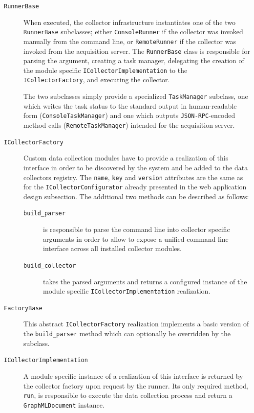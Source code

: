 \begin{description}
  \item[\texttt{RunnerBase}] When executed, the collector infrastructure instantiates one of the two \texttt{Runner\BreakableSlash{}Base} subclasses; either \texttt{ConsoleRunner} if the collector was invoked manually from the command line, or \texttt{RemoteRunner} if the collector was invoked from the acquisition server. The \texttt{RunnerBase} class is responsible for parsing the argument, creating a task manager, delegating the creation of the module specific \texttt{ICollectorImplementation} to the \texttt{ICollectorFactory}, and executing the collector.

    The two subclasses simply provide a specialized \texttt{TaskManager} subclass, one which writes the task status to the standard output in human-readable form (\texttt{ConsoleTask\BreakableSlash{}Manager}) and one which outputs \texttt{JSON-RPC}-encoded method calls (\texttt{RemoteTask\BreakableSlash{}Manager}) intended for the acquisition server.
  \item[\texttt{ICollectorFactory}] Custom data collection modules have to provide a realization of this interface in order to be discovered by the system and be added to the data collectors registry. The \texttt{name}, \texttt{key} and \texttt{version} attributes are the same as for the \texttt{ICollector\BreakableSlash{}Configurator} already presented in the web application design subsection. The additional two methods can be described as follows:
    \begin{description}
      \item[\texttt{build\_parser}] is responsible to parse the command line into collector specific arguments in order to allow to expose a unified command line interface across all installed collector modules.
      \item[\texttt{build\_collector}] takes the parsed arguments and returns a configured instance of the module specific \texttt{ICollectorImplementation} realization.
    \end{description}
  \item[\texttt{FactoryBase}] This abstract \texttt{ICollectorFactory} realization implements a basic version of the \texttt{build\_parser} method which can optionally be overridden by the subclass.
  \item[\texttt{ICollectorImplementation}] A module specific instance of a realization of this interface is returned by the collector factory upon request by the runner. Its only required method, \texttt{run}, is responsible to execute the data collection process and return a \texttt{GraphMLDocument} instance.
\end{description}


